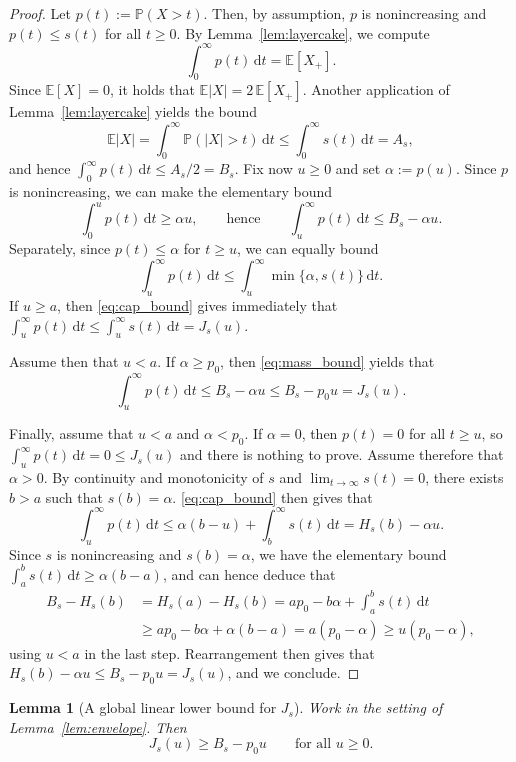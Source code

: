 \documentclass[11pt]{article}
\newcommand{\Pbb}{\mathbb{P}}
\newcommand{\Ebb}{\mathbb{E}}
\newtheorem{lemma}[theorem]{Lemma}
\begin{document}
\begin{proof}
Let $p(t) := \Pbb(X > t)$. Then, by assumption, $p$ is nonincreasing and $p(t) \le s(t)$ for all $t \ge 0$. By Lemma~\ref{lem:layercake}, we compute
%
\[
\int_0^\infty p(t)\, \mathrm{d}t=\Ebb[X_+].
\]
%
Since $\Ebb[X]=0$, it holds that $\Ebb|X| = 2\,\Ebb[X_+]$. Another application of Lemma~\ref{lem:layercake} yields the bound
%
\[
\Ebb|X| = \int_0^\infty \Pbb(|X| > t)\, \mathrm{d}t \le \int_0^\infty s(t) \, \mathrm{d}t = A_s,
\]
%
and hence $\int_0^\infty p(t) \, \mathrm{d}t\le A_s/2 = B_s$.
Fix now $u\ge 0$ and set $\alpha := p(u)$. Since $p$ is nonincreasing, we can make the elementary bound
%
\[
\int_0^u p(t)\, \mathrm{d}t\ge \alpha u,
\qquad\text{hence}\qquad
\int_u^\infty p(t)\, \mathrm{d}t\le B_s-\alpha u.
\tag{M}\label{eq:mass_bound}
\]
%
Separately, since $p(t)\le \alpha$ for $t\ge u$, we can equally bound
%
\[
\int_u^\infty p(t) \, \mathrm{d}t \le \int_u^\infty \min \{\alpha, s(t)\}\, \mathrm{d}t.
\tag{C}\label{eq:cap_bound}
\]
%
If $u \ge a$, then \eqref{eq:cap_bound} gives immediately that $\int_u^\infty p(t) \, \mathrm{d}t \le \int_u^\infty s(t)\, \mathrm{d}t = J_s(u)$.

Assume then that $u<a$. If $\alpha\ge p_0$, then \eqref{eq:mass_bound} yields that
%
\[
\int_u^\infty p(t) \, \mathrm{d}t \le B_s - \alpha u \le B_s-p_0 u = J_s (u).
\]
%

Finally, assume that $u<a$ and $\alpha < p_0$.
If $\alpha = 0$, then $p(t) = 0$ for all $t \ge u$, so $\int_u^\infty p(t)\,\mathrm{d}t = 0 \le J_s(u)$ and there is nothing to prove.
Assume therefore that $\alpha > 0$. By continuity and monotonicity of $s$ and $\lim_{t\to\infty} s(t) = 0$, there exists $b > a$ such that $s(b) = \alpha$.
\eqref{eq:cap_bound} then gives that
%
\[
\int_u^\infty p(t)\, \mathrm{d}t\le \alpha(b-u)+\int_b^\infty s(t)\, \mathrm{d}t = H_s(b)-\alpha u.
\]
%
Since $s$ is nonincreasing and $s(b) = \alpha$, we have the elementary bound $\int_a^b s(t)\, \mathrm{d}t\ge \alpha(b-a)$, and can hence deduce that
%
\begin{align*}
B_s - H_s(b)
&=H_s(a) - H_s(b)
= a p_0 - b \alpha + \int_a^b s(t) \, \mathrm{d}t\\
&\ge a p_0 - b \alpha + \alpha (b-a)
= a(p_0 - \alpha)
\ge u (p_0 - \alpha),
\end{align*}
%
using $u<a$ in the last step. Rearrangement then gives that $H_s(b) - \alpha u \le B_s - p_0 u = J_s (u)$, and we conclude.
\end{proof}

\begin{lemma}[A global linear lower bound for $J_s$]\label{lem:J_ge_line}
Work in the setting of Lemma~\ref{lem:envelope}. Then
%
\[
J_s (u) \ge B_s - p_0 u \qquad \text{for all } u \ge 0.
\]
%
\end{lemma}
\end{document}
